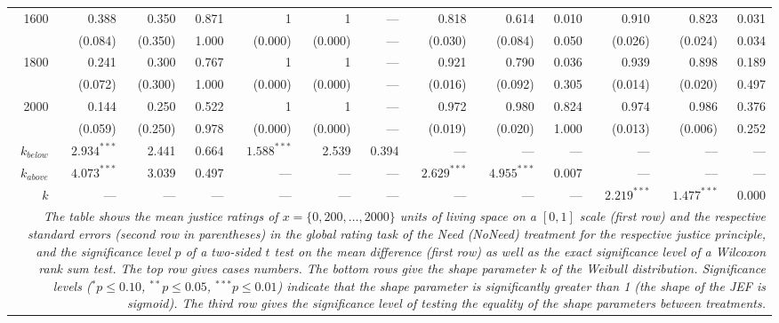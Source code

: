 \documentclass[12pt]{scrartcl}
\begin{document}
\begin{landscape}
\begin{table}[h!t!]
{\begin{tabular}{rrrrrrrrrrrrr}
            1600          &  0.388          &  0.350    & 0.871    &  1              &  1        & ---      &  0.818          &  0.614           & 0.010   &  0.910          &  0.823          & 0.031   \\
                          & (0.084)         & (0.350)   & 1.000    & (0.000)         & (0.000)   & ---      & (0.030)         & (0.084)          & 0.050   & (0.026)         & (0.024)         & 0.034   \\
            1800          &  0.241          &  0.300    & 0.767    &  1              &  1        & ---      &  0.921          &  0.790           & 0.036   &  0.939          &  0.898          & 0.189   \\
                          & (0.072)         & (0.300)   & 1.000    & (0.000)         & (0.000)   & ---      & (0.016)         & (0.092)          & 0.305   & (0.014)         & (0.020)         & 0.497   \\
            2000          &  0.144          &  0.250    & 0.522    &  1              &  1        & ---      &  0.972          &  0.980           & 0.824   &  0.974          &  0.986          & 0.376   \\
                          & (0.059)         & (0.250)   & 0.978    & (0.000)         & (0.000)   & ---      & (0.019)         & (0.020)          & 1.000   & (0.013)         & (0.006)         & 0.252   \\\hline
            $k_{below}$   & $2.934^{***}$   &  2.441    & 0.664    & $1.588^{***}$   &  2.539    & 0.394    & ---             & ---              & ---     & ---             & ---             & ---     \\
            $k_{above}$   & $4.073^{***}$   &  3.039    & 0.497    & ---             & ---       & ---      & $2.629^{***}$   & $4.955^{***}$    & 0.007   & ---             & ---             & ---     \\
            $k$           & ---             & ---       & ---      & ---             & ---       & ---      & ---             & ---              & ---     & $2.219^{***}$   & $1.477^{***}$   & 0.000   \\\hline
            \multicolumn{13}{p{0.85\linewidth}}{\footnotesize\textit{The table shows the mean justice ratings of $x=\{0,200,\ldots,2000\}$ units of living space on a $[0,1]$ scale (first row) and the respective standard errors (second row in parentheses) in the global rating task of the Need (NoNeed) treatment for the respective justice principle, and the significance level $p$ of a two-sided $t$ test on the mean difference (first row) as well as the exact significance level of a Wilcoxon rank sum test. The top row gives cases numbers. The bottom rows give the shape parameter $k$ of the Weibull distribution. Significance levels ($^{*}p\le 0.10$, $^{**}p\le 0.05$, $^{***}p\le 0.01$) indicate that the shape parameter is significantly greater than 1 (the shape of the JEF is sigmoid). The third row gives the significance level of testing the equality of the shape parameters between treatments.}}

\end{tabular}}
\end{table}
\end{landscape}
\end{document}
